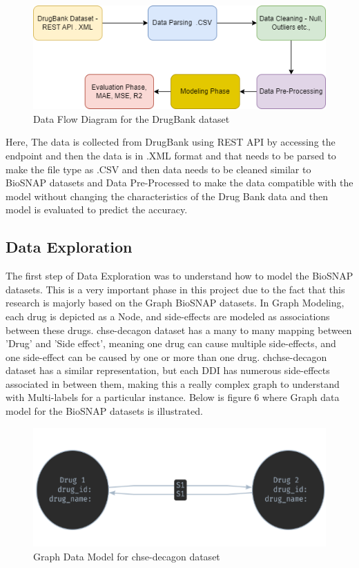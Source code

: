 \documentclass[journal,transmag]{J-NaNA}
\begin{document}
\begin{figure}[htbp]
\centering
\includegraphics[width=\linewidth]{ML DataFlow Diagram.drawio.png} 
\caption{Data Flow Diagram for the DrugBank dataset}
\label{fig: chchse-decagon data flow diagram} %
\end{figure}

Here, The data is collected from DrugBank using REST API by accessing the endpoint and then the data is in .XML format and that needs to be parsed to make the file type as .CSV and then data needs to be cleaned similar to BioSNAP datasets and Data Pre-Processed to make the data compatible with the model without changing the characteristics of the Drug Bank data and then model is evaluated to predict the accuracy. 

\subsection{Data Exploration}
The first step of Data Exploration was to understand how to model the BioSNAP datasets. This is a very important phase in this project due to the fact that this research is majorly based on the Graph BioSNAP datasets. In Graph Modeling, each drug is depicted as a Node, and side-effects are modeled as associations between these drugs. chse-decagon dataset has a many to many mapping between 'Drug' and 'Side effect', meaning one drug can cause multiple side-effects, and one side-effect can be caused by one or more than one drug. chchse-decagon dataset has a similar representation, but each DDI has numerous side-effects associated in between them, making this a really complex graph to understand with Multi-labels for a particular instance. Below is figure 6 where Graph data model for the BioSNAP datasets is illustrated. 

\begin{figure}[htbp]
\centering
\includegraphics[width=\linewidth]{chse-decagon-graph.PNG} 
\caption{Graph Data Model for chse-decagon dataset}
\label{fig: chse-decagon sample Graph Data Model} %
\end{figure}
\end{document}
